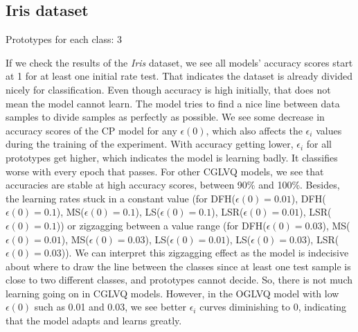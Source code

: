 \subsection{Iris dataset}

Prototypes for each class: 3
\vspace{5pt}


If we check the results of the \textit{Iris} dataset, we see all models’ accuracy scores start at 1 for at least one initial rate test. That indicates the dataset is already divided nicely for classification. Even though accuracy is high initially, that does not mean the model cannot learn. The model tries to find a nice line between data samples to divide samples as perfectly as possible. We see some decrease in accuracy scores of the CP model for any $\epsilon(0)$, which also affects the $\epsilon_{i}$ values during the training of the experiment. With accuracy getting lower, $\epsilon_{i}$ for all prototypes get higher, which indicates the model is learning badly. It classifies worse with every epoch that passes. For other CGLVQ models, we see that accuracies are stable at high accuracy scores, between 90\% and 100\%. Besides, the learning rates stuck in a constant value (for DFH($\epsilon(0)=0.01$), DFH($\epsilon(0)=0.1$), MS($\epsilon(0)=0.1$), LS($\epsilon(0)=0.1$), LSR($\epsilon(0)=0.01$), LSR($\epsilon(0)=0.1$)) or zigzagging between a value range (for DFH($\epsilon(0)=0.03$), MS($\epsilon(0)=0.01$), MS($\epsilon(0)=0.03$), LS($\epsilon(0)=0.01$), LS($\epsilon(0)=0.03$), LSR($\epsilon(0)=0.03$)). We can interpret this zigzagging effect as the model is indecisive about where to draw the line between the classes since at least one test sample is close to two different classes, and prototypes cannot decide. So, there is not much learning going on in CGLVQ models. However, in the OGLVQ model with low $\epsilon(0)$ such as 0.01 and 0.03, we see better $\epsilon_{i}$ curves diminishing to 0, indicating that the model adapts and learns greatly.


